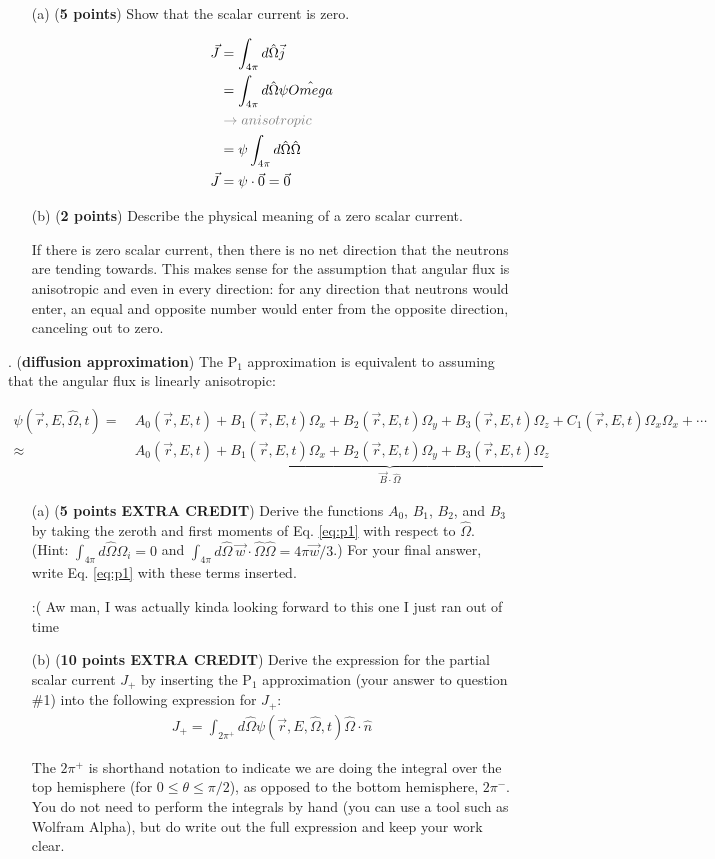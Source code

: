 \documentclass[11pt]{article}
\newcommand{\hO}{\hat{\Omega}}
\newcommand{\beq}{\begin{equation}\begin{aligned}}
\newcommand{\eeq}{\end{aligned}\end{equation}}
\newcommand{\ans}[1]{{\color{violet}#1}}
\begin{document}
\begin{enumerate}
\item[(a)] ({\bf 5 points}) Show that the scalar current is zero. 
\item[] \ans{
    \begin{align*}
        \vec{J}&=\int_{4\pi}d\hat{\Omega}\vec{j} \\
        &= \int_{4\pi}d\hat{\Omega}\psi\hat{Omega} \\
        &\color{gray}\rightarrow anisotropic \\
        &= \psi\int_{4\pi}d\hat{\Omega}\hat{\Omega}\\
        \vec{J}&= \psi\cdot\vec{0} = \vec{0}
    \end{align*}

}
\item[(b)] ({\bf 2 points}) Describe the physical meaning of a zero scalar current.
\item[] \ans{If there is zero scalar current, then there is no net direction that the neutrons are tending towards.
This makes sense for the assumption that angular flux is anisotropic and even in every direction: for any direction that neutrons would enter, an equal and opposite number would enter from the opposite direction, canceling out to zero.}
\end{enumerate}

\clearpage
{}. ({\bf diffusion approximation}) The P$_1$ approximation is equivalent to assuming that the angular flux is linearly anisotropic:

\beq
\label{eq:p1}
\psi(\vec{r},E,\hO,t)=&\ A_0(\vec{r},E,t)+B_1(\vec{r},E,t)\Omega_x+B_2(\vec{r},E,t)\Omega_y+B_3(\vec{r},E,t)\Omega_z+C_1(\vec{r},E,t)\Omega_x\Omega_x+\cdots\\
\approx&\ A_0(\vec{r},E,t)+\underbrace{B_1(\vec{r},E,t)\Omega_x+B_2(\vec{r},E,t)\Omega_y+B_3(\vec{r},E,t)\Omega_z}_{\vec{B}\cdot\hO}
\eeq

\begin{enumerate}
\item[(a)] ({\bf 5 points EXTRA CREDIT}) Derive the functions $A_0$, $B_1$, $B_2$, and $B_3$ by taking the zeroth and first moments of Eq. \eqref{eq:p1} with respect to $\hO$. (Hint: $\int_{4\pi}d\hO\Omega_i=0$ and $\int_{4\pi}d\hO\ \vec{w}\cdot\hO\hO=4\pi\vec{w}/3$.) For your final answer, write Eq. \eqref{eq:p1} with these terms inserted.
\item[] \ans{:( Aw man, I was actually kinda looking forward to this one I just ran out of time}
\item[(b)] ({\bf 10 points EXTRA CREDIT}) Derive the expression for the partial scalar current $J_+$ by inserting the P$_1$ approximation (your answer to question \#1) into the following expression for $J_+$:
\beq
\label{eq:Jp}
J_+=\int_{2\pi^+}d\hO\psi(\vec{r},E,\hO,t)\hO\cdot\hat{n}
\eeq

The $2\pi^+$ is shorthand notation to indicate we are doing the integral over the top hemisphere (for $0\leq\theta\leq\pi/2$), as opposed to the bottom hemisphere, $2\pi^-$. You do not need to perform the integrals by hand (you can use a tool such as Wolfram Alpha), but do write out the full expression and keep your work clear.
\end{enumerate}
\end{document}
